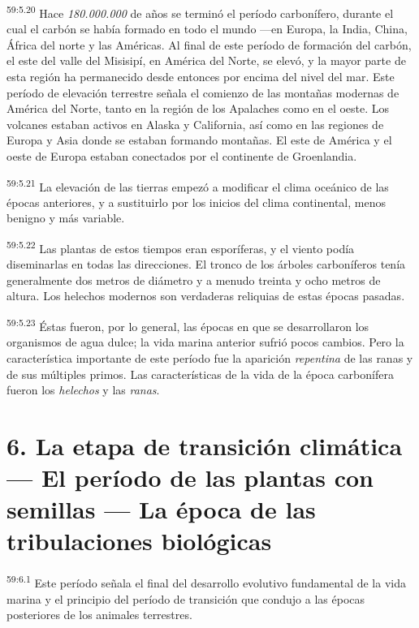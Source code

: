 \par
\textsuperscript{59:5.20} Hace \textit{180.000.000} de años se terminó el período carbonífero, durante el cual el carbón se había formado en todo el mundo ---en Europa, la India, China, África del norte y las Américas. Al final de este período de formación del carbón, el este del valle del Misisipí, en América del Norte, se elevó, y la mayor parte de esta región ha permanecido desde entonces por encima del nivel del mar. Este período de elevación terrestre señala el comienzo de las montañas modernas de América del Norte, tanto en la región de los Apalaches como en el oeste. Los volcanes estaban activos en Alaska y California, así como en las regiones de Europa y Asia donde se estaban formando montañas. El este de América y el oeste de Europa estaban conectados por el continente de Groenlandia.

\par
\textsuperscript{59:5.21} La elevación de las tierras empezó a modificar el clima oceánico de las épocas anteriores, y a sustituirlo por los inicios del clima continental, menos benigno y más variable.

\par
\textsuperscript{59:5.22} Las plantas de estos tiempos eran esporíferas, y el viento podía diseminarlas en todas las direcciones. El tronco de los árboles carboníferos tenía generalmente dos metros de diámetro y a menudo treinta y ocho metros de altura. Los helechos modernos son verdaderas reliquias de estas épocas pasadas.

\par
\textsuperscript{59:5.23} Éstas fueron, por lo general, las épocas en que se desarrollaron los organismos de agua dulce; la vida marina anterior sufrió pocos cambios. Pero la característica importante de este período fue la aparición \textit{repentina} de las ranas y de sus múltiples primos. Las características de la vida de la época carbonífera fueron los \textit{helechos} y las \textit{ranas}.

\section*{6. La etapa de transición climática --- El período de las plantas con semillas --- La época de las tribulaciones biológicas}
\par
\textsuperscript{59:6.1} Este período señala el final del desarrollo evolutivo fundamental de la vida marina y el principio del período de transición que condujo a las épocas posteriores de los animales terrestres.

